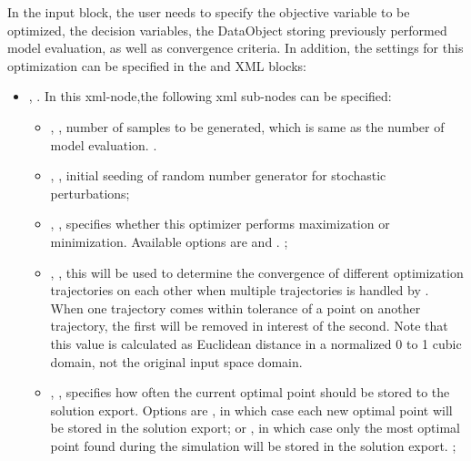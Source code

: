In the  input block, the user needs to specify the objective variable to be optimized, the decision variables, the
DataObject storing previously performed model evaluation, as well as convergence criteria. In addition, the settings for this
optimization can be specified in the  and  XML blocks:
\begin{itemize}
\item {},  . In this xml-node,the following xml sub-nodes can be
specified:
  \begin{itemize}
    \item {}, , number of samples to be generated, which is same as the number of
    model evaluation. .
    \item {}, , initial seeding of random number generator for stochastic
    perturbations;
    \item {},  , specifies whether this optimizer performs maximization
    or minimization. Available options are  and .
    ;
    \item {}, , this will be used to determine the convergence of different
    optimization trajectories on each other when multiple trajectories is handled by .  When one
    trajectory comes within tolerance of a point on another trajectory, the first will be removed in interest
    of the second.  Note that this value is
    calculated as Euclidean distance in a normalized 0 to 1 cubic domain, not the original input space domain.
    \item {},  , specifies how often the current optimal
      point should be stored to the solution export.  Options are , in which case each new
      optimal point will be stored in the solution export; or , in which case only the most
      optimal point found during the simulation will be stored in the solution export.
    ;

  \end{itemize}
\end{itemize}
